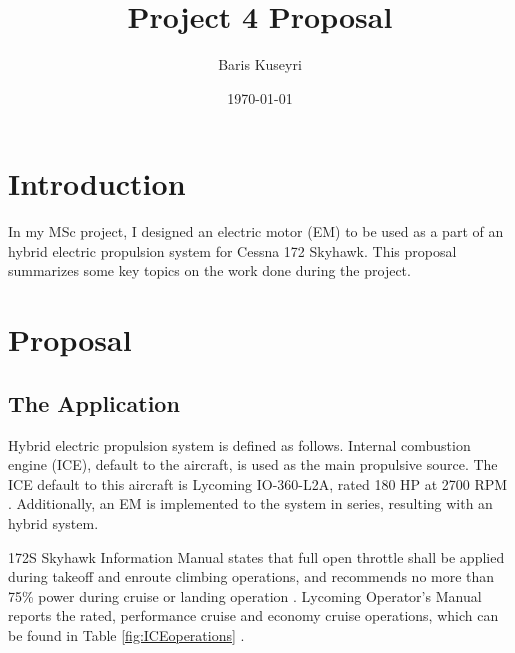 \documentclass[11pt, a4paper]{article}
\begin{document}
	\title{Project 4 Proposal}
	\author{Baris Kuseyri}
	\date{\today}
	\maketitle

	\newpage
	\section{Introduction}
	In my MSc project, I designed an electric motor (EM) to be used as a part of an hybrid electric propulsion system for Cessna 172 Skyhawk. This proposal summarizes some key topics on the work done during the project.
	\section{Proposal}
	\label{sec:previousWork}
	\subsection{The Application}
	Hybrid electric propulsion system is defined as follows. Internal combustion engine (ICE), default to the aircraft, is used as the main propulsive source. The ICE default to this aircraft is Lycoming IO-360-L2A, rated 180 HP at 2700 RPM \cite{io360operatorsManual}. Additionally, an EM is implemented to the system in series, resulting with an hybrid system.
	
	172S Skyhawk Information Manual states that  full open throttle shall be applied during takeoff and enroute climbing operations, and recommends no more than 75\% power during cruise or landing operation \cite{172SIM}. Lycoming Operator's Manual reports the rated, performance cruise and economy cruise operations, which can be found in Table \ref{fig:ICEoperations} \cite{io360operatorsManual}.
	
\end{document}
